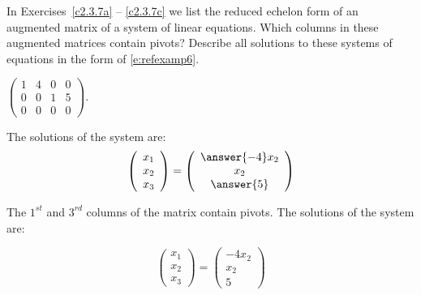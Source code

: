 \documentclass{ximera}
\begin{document}
\noindent In Exercises~\ref{c2.3.7a} -- \ref{c2.3.7c} we list
the reduced echelon form of an augmented matrix of a system of
linear equations.  Which columns in these augmented matrices
contain pivots?  Describe all solutions to these systems of
equations in the form of \eqref{e:refexamp6}.
\begin{exercise} \label{c2.3.7a}
$\left(\begin{array}{rrr|r}
 1  &  4 & 0 & 0\\
 0  &  0 & 1 & 5\\
 0  &  0 & 0 & 0
       \end{array}\right)$.
     \begin{selectAll}
     \end{selectAll}
     
     \begin{exercise}
       The solutions of the system are:
\[
\left(\begin{array}{r} x_1 \\ x_2 \\ x_3\end{array} \right)
= \left(\begin{array}{c} \answer{-4}x_2 \\ x_2 \\ \answer{5}\end{array} \right)
\]

\begin{solution}
The $1^{st}$ and $3^{rd}$ columns of the matrix contain
pivots.  The solutions of the system are:

\[
\left(\begin{array}{r} x_1 \\ x_2 \\ x_3\end{array} \right)
= \left(\begin{array}{c} -4x_2 \\ x_2 \\ 5\end{array} \right)
\]

\end{solution}
     \end{exercise}

\begin{solution}


\end{solution}
\end{exercise}
\end{document}
